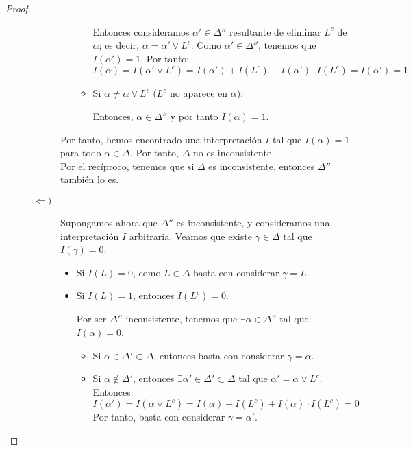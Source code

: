 \documentclass[12pt]{article}
\begin{document}
\begin{ejercicio}
\begin{proof}
\begin{description}
\begin{description}
\begin{itemize}
\begin{itemize}
                            Entonces consideramos $\alpha'\in \Delta''$ resultante de eliminar $L^c$ de $\alpha$; es decir, $\alpha=\alpha'\lor L^c$. Como $\alpha'\in \Delta''$, tenemos que $I(\alpha')=1$. Por tanto:
                            \begin{equation*}
                                I(\alpha)=I(\alpha'\lor L^c)=I(\alpha')+I(L^c)+I(\alpha')\cdot I(L^c)=I(\alpha')=1
                            \end{equation*}

                            \item Si $\alpha\neq \alpha\lor L^c$ ($L^c$ no aparece en $\alpha$):
                            
                            Entonces, $\alpha\in \Delta''$ y por tanto $I(\alpha)=1$.
                        \end{itemize}
                    \end{itemize}

                    Por tanto, hemos encontrado una interpretación $I$ tal que $I(\alpha)=1$ para todo $\alpha\in \Delta$. Por tanto, $\Delta$ no es inconsistente.\\

                    Por el recíproco, tenemos que si $\Delta$ es inconsistente, entonces $\Delta''$ también lo es.

                    \item[$\Longleftarrow)$] Supongamos ahora que $\Delta''$ es inconsistente, y consideramos una interpretación $I$ arbitraria. Veamos que existe $\gamma\in \Delta$ tal que $I(\gamma)=0$.
                    \begin{itemize}
                        \item Si $I(L)=0$, como $L\in \Delta$ basta con considerar $\gamma=L$.
                        \item Si $I(L)=1$, entonces $I(L^c)=0$.
                        
                        Por ser $\Delta''$ inconsistente, tenemos que $\exists \alpha\in \Delta''$ tal que $I(\alpha)=0$.
                        \begin{itemize}
                            \item Si $\alpha\in \Delta'\subset \Delta$, entonces basta con considerar $\gamma=\alpha$.
                            \item Si $\alpha\notin \Delta'$, entonces $\exists \alpha'\in \Delta'\subset \Delta$ tal que $\alpha'=\alpha\lor L^c$.
                            Entonces:
                            \begin{equation*}
                                I(\alpha')=I(\alpha\lor L^c)=I(\alpha)+I(L^c)+I(\alpha)\cdot I(L^c)=0
                            \end{equation*}
                            Por tanto, basta con considerar $\gamma=\alpha'$.
                        \end{itemize}
                    \end{itemize}


\end{description}
\end{description}
\end{proof}
\end{ejercicio}
\end{document}
